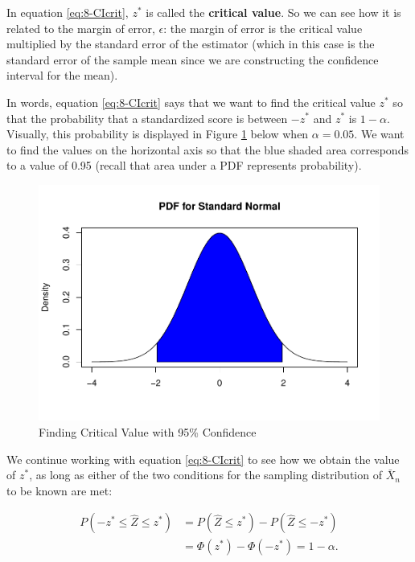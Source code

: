 \documentclass[
]{book}
\begin{document}
In equation \eqref{eq:8-CIcrit}, \(z^*\) is called the \textbf{critical value}. So we can see how it is related to the margin of error, \(\epsilon\): the margin of error is the critical value multiplied by the standard error of the estimator (which in this case is the standard error of the sample mean since we are constructing the confidence interval for the mean).

In words, equation \eqref{eq:8-CIcrit} says that we want to find the critical value \(z^*\) so that the probability that a standardized score is between \(-z^*\) and \(z^*\) is \(1 - \alpha\). Visually, this probability is displayed in Figure \ref{fig:8-crit} below when \(\alpha=0.05\). We want to find the values on the horizontal axis so that the blue shaded area corresponds to a value of 0.95 (recall that area under a PDF represents probability).

\begin{figure}
\centering
\includegraphics{bookdown-demo_files/figure-latex/8-crit-1.pdf}
\caption{\label{fig:8-crit}Finding Critical Value with 95\% Confidence}
\end{figure}

We continue working with equation \eqref{eq:8-CIcrit} to see how we obtain the value of \(z^*\), as long as either of the two conditions for the sampling distribution of \(\bar{X}_n\) to be known are met:

\begin{equation} 
\begin{split}
P(-z^{*} \leq \hat{Z} \leq z^{*}) &= P(\hat{Z} \leq z^{*}) - P(\hat{Z} \leq -z^{*}) \\
                                  &= \Phi(z^{*}) - \Phi(-z^{*}) = 1 - \alpha.
\end{split}
\label{eq:8-CIcrit2}
\end{equation}
\end{document}
